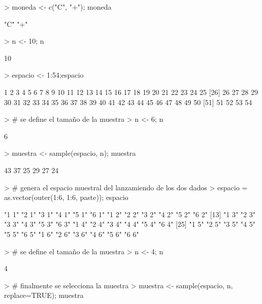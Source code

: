 \documentclass{article}
\begin{document}
\begin{Schunk}
\begin{Sinput}
> moneda <- c("C", "+"); moneda
\end{Sinput}
\begin{Soutput}
[1] "C" "+"
\end{Soutput}
\begin{Sinput}
> n <- 10; n
\end{Sinput}
\begin{Soutput}
[1] 10
\end{Soutput}
\begin{Sinput}
> espacio <- 1:54;espacio
\end{Sinput}
\begin{Soutput}
 [1]  1  2  3  4  5  6  7  8  9 10 11 12 13 14 15 16 17 18 19 20 21 22 23 24 25
[26] 26 27 28 29 30 31 32 33 34 35 36 37 38 39 40 41 42 43 44 45 46 47 48 49 50
[51] 51 52 53 54
\end{Soutput}
\begin{Sinput}
> # se define el tamaño de la muestra
> n <- 6; n
\end{Sinput}
\begin{Soutput}
[1] 6
\end{Soutput}
\begin{Sinput}
> muestra <- sample(espacio, n); muestra
\end{Sinput}
\begin{Soutput}
[1] 43 37 25 29 27 24
\end{Soutput}
\begin{Sinput}
> # genera el espacio muestral del lanzamiendo de los dos dados
> espacio = as.vector(outer(1:6, 1:6, paste)); espacio
\end{Sinput}
\begin{Soutput}
 [1] "1 1" "2 1" "3 1" "4 1" "5 1" "6 1" "1 2" "2 2" "3 2" "4 2" "5 2" "6 2"
[13] "1 3" "2 3" "3 3" "4 3" "5 3" "6 3" "1 4" "2 4" "3 4" "4 4" "5 4" "6 4"
[25] "1 5" "2 5" "3 5" "4 5" "5 5" "6 5" "1 6" "2 6" "3 6" "4 6" "5 6" "6 6"
\end{Soutput}
\begin{Sinput}
> # se define el tamaño de la muestra
> n <- 4; n
\end{Sinput}
\begin{Soutput}
[1] 4
\end{Soutput}
\begin{Sinput}
> # finalmente se selecciona la muestra
> muestra <- sample(espacio, n, replace=TRUE); muestra
\end{Sinput}
\begin{Soutput}

\end{Soutput}
\end{Schunk}
\end{document}

